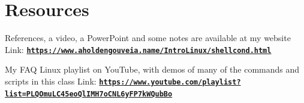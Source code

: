 \documentclass[12pt]{article}
\begin{document}
\section*{Resources}
References, a video, a PowerPoint and some notes are available at my website
Link: \href{https://www.aholdengouveia.name/IntroLinux/shellcond.html}{\textbf{\nolinkurl{https://www.aholdengouveia.name/IntroLinux/shellcond.html}}}

My FAQ Linux playlist on YouTube, with demos of many of the commands and scripts in this class
Link: \href{https://www.youtube.com/playlist?list=PLQOmuLC45eoQlIMH7oCNL6yFP7kWQubBo}{\textbf{\nolinkurl{https://www.youtube.com/playlist?list=PLQOmuLC45eoQlIMH7oCNL6yFP7kWQubBo}}}
\end{document}

